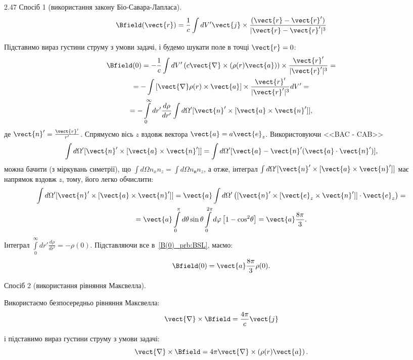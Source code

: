 \begin{Solution}{2.{47}}
	Спосіб 1 (використання закону Біо-Савара-Лапласа).
	\[
		\Bfield(\vect{r}) = \frac1c \int dV' \vect{j} \times \frac{(\vect{r} - \vect{r}')}{|\vect{r} - \vect{r}'|^3}
	\]

	Підставимо вираз густини струму з умови задачі, і будемо шукати поле в точці $\vect{r} = 0$:
	\begin{multline}\label{B(0)_prb:BSL}
		\Bfield(0) = -\frac1c \int dV' \left( c\vect{\nabla}\times \left( \rho(r) \vect{a}\right) \right) \times \frac{\vect{r}'}{|\vect{r}'|^3} = \\
		= -\int \left[ \vect{\nabla}\rho(r)\times\vect{a} \right] \times \frac{\vect{r}'}{|\vect{r}'|^3} dV' = \\
		= -\int\limits_0^{\infty} dr'\frac{d\rho}{dr'} \int d\Omega' [{\vect{n}}' \times [{\vect{a}} \times {\vect{n}}']],
	\end{multline}
	де $\vect{n}' = \frac{\vect{r}'}{r'}$. Спрямуємо вісь $z$ вздовж вектора  $\vect{a} = a\vect{e}_z$. Використовуючи <<BAC - CAB>>
	\[
		\int {d\Omega'} [{\vect{n}}' \times [{\vect{a}} \times {\vect{n}}']] = \int {d\Omega'} [\vect{a} - \vect{n}'(\vect{a} \cdot {\vect{n}}')],
	\]
	можна бачити (з міркувань симетрії), що  $\int d\Omega n_x n_z = \int d\Omega n_н n_z $, а отже, інтеграл  $\int {d\Omega'} [{\vect{n}}' \times [{\vect{a}} \times {\vect{n}}']] $ має напрямок вздовж $z$, тому, його легко обчислити:
	\begin{multline}
		\int d\Omega' [{\vect{n}}' \times [{\vect{a}} \times {\vect{n}}']] = {\vect{a}}\int {d\Omega'} \left( {[{\vect{n}}' \times [{{\vect{e}}_z} \times {\vect{n}}']] \cdot {{\vect{e}}_z}} \right) = \\
		= \vect{a}\int\limits_0^\pi  {d\theta } \sin \theta \int\limits_0^{2\pi } {d\varphi } \left[ {1 - {\cos^2}\theta } \right] = \vect{a}\frac{8\pi}{3}.
	\end{multline}
	Інтеграл $\int\limits_0^{\infty} dr'\frac{d\rho}{dr'} = -\rho(0)$.
	Підставляючи все в~\eqref{B(0)_prb:BSL}, маємо:
	\[
		\Bfield(0) = \vect{a}\frac{8\pi}{3}\rho(0).
	\]

	Спосіб 2 (використання рівняння Максвелла).

	Використаємо безпосередньо рівняння Максвелла:
	\[
		\vect{\nabla}\times\Bfield = \frac{4\pi}{c}\vect{j}
	\]

	і підставимо вираз густини струму з умови задачі:
	\[
		\vect{\nabla}\times\Bfield = 4\pi\vect{\nabla}\times \left( \rho(r) \vect{a}\right).
	\]


\end{Solution}
